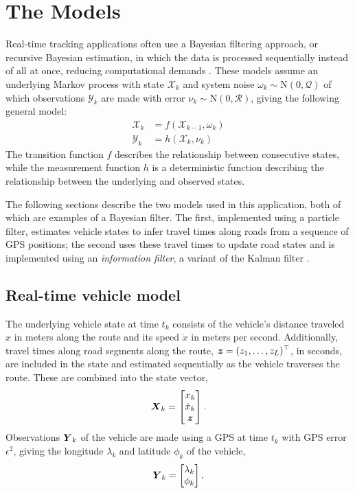 \section{The Models}
\label{sec:models}

Real-time tracking applications often use
a Bayesian filtering approach,
or recursive Bayesian estimation,
in which the data is processed sequentially instead of all at once,
reducing computational demands
\citep{Anderson_2012}.
These models assume an underlying Markov process with state $\mathcal{X}_k$
and system noise $\omega_k\sim\mathrm{N}(0,\mathcal{Q})$ 
of which observations $\mathcal{Y}_k$ are made
with error $\nu_k\sim\mathrm{N}(0,\mathcal{R})$,
giving the following general model:
\begin{equation}
\label{eq:rbe_model}
\begin{split}
\mathcal{X}_k &= f(\mathcal{X}_{k-1}, \omega_k) \\
\mathcal{Y}_k &= h(\mathcal{X}_k, \nu_k)
\end{split}
\end{equation}
The transition function $f$ describes the relationship between consecutive states,
while the measurement function $h$ is a deterministic function describing the
relationship between the underlying and observed states.

The following sections describe the two models used in this application,
both of which are examples of a Bayesian filter.
The first, implemented using a particle filter, estimates vehicle states
to infer travel times along roads from a sequence of GPS positions;
the second uses these travel times to update road states 
and is implemented using an \emph{information filter},
a variant of the Kalman filter \citep{Anderson_2012}.

\subsection{Real-time vehicle model}
\label{sec:pf}

The underlying vehicle state at time $t_k$ consists of
the vehicle's distance traveled $x$ in meters along the route and
its speed $\dot x$ in meters per second.
Additionally, travel times along road segments along the route, 
$\boldsymbol{z} = (z_1,\ldots,z_L)^\top$, in seconds,
are included in the state and estimated
sequentially as the vehicle traverses the route.
These are combined into the state vector,
\begin{equation}
\label{eq:vehicle_state}
\mbox{$\boldsymbol{X}$}_k = 
\begin{bmatrix}
    x_k \\ \dot x_k \\ \boldsymbol{z}
\end{bmatrix}.
\end{equation}
Observations $\mbox{$\boldsymbol{Y}$}_k$ of the vehicle are made using a GPS at time $t_k$
with GPS error $\epsilon^2$,
giving the longitude $\lambda_k$ and latitude $\phi_k$ of the vehicle,
\begin{equation}
\label{eq:vehicle_obs}
\mbox{$\boldsymbol{Y}$}_k = \begin{bmatrix} \lambda_k \\ \phi_k \end{bmatrix}.
\end{equation}


